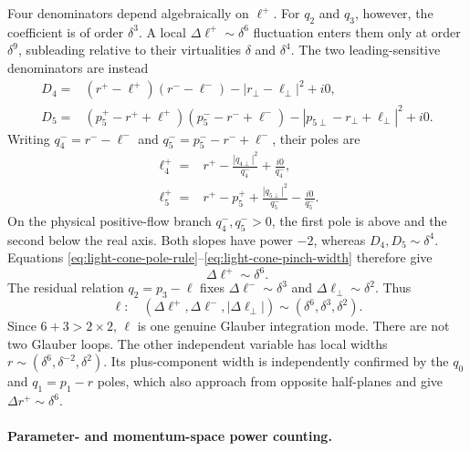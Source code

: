 \documentclass[a4paper,11pt]{article}
\begin{document}
Four denominators depend algebraically on \(\ell^+\).  For \(q_2\) and
\(q_3\), however, the coefficient is of order \(\delta^3\).  A local
\(\Delta\ell^+\sim\delta^6\) fluctuation enters them only at order
\(\delta^9\), subleading relative to their virtualities \(\delta\) and
\(\delta^4\).  The two leading-sensitive denominators are instead
\begin{align}
 D_4={}&(r^+-\ell^+)(r^--\ell^-)
       -|r_\perp-\ell_\perp|^2+i0,
 \label{eq:five-mrk-D4}\\
 D_5={}&(p_5^+-r^++\ell^+)(p_5^--r^-+\ell^-)
       -|p_{5\perp}-r_\perp+\ell_\perp|^2+i0.
 \label{eq:five-mrk-D5}
\end{align}
Writing \(q_4^-=r^--\ell^-\) and
\(q_5^-=p_5^--r^-+\ell^-\), their poles are
\begin{align}
 \ell_4^+={}&r^+-\frac{|q_{4\perp}|^2}{q_4^-}
              +\frac{i0}{q_4^-},
 \label{eq:five-mrk-pole4}\\
 \ell_5^+={}&r^+-p_5^++\frac{|q_{5\perp}|^2}{q_5^-}
              -\frac{i0}{q_5^-}.
 \label{eq:five-mrk-pole5}
\end{align}
On the physical positive-flow branch \(q_4^-,q_5^->0\), the first pole is
above and the second below the real axis.  Both slopes have power \(-2\),
whereas \(D_4,D_5\sim\delta^4\).  Equations
\eqref{eq:light-cone-pole-rule}--\eqref{eq:light-cone-pinch-width} therefore
give
\begin{equation}
 \Delta\ell^+\sim\delta^6.
 \label{eq:five-mrk-ellplus-width}
\end{equation}
The residual relation \(q_2=p_3-\ell\) fixes
\(\Delta\ell^-\sim\delta^3\) and
\(\Delta\ell_\perp\sim\delta^2\).  Thus
\begin{equation}
 \ell:\quad (\Delta\ell^+,\Delta\ell^-,
                   |\Delta\ell_\perp|)
       \sim(\delta^6,\delta^3,\delta^2).
 \label{eq:five-mrk-glauber-widths}
\end{equation}
Since \(6+3>2\times2\), \(\ell\) is one genuine Glauber integration mode.
There are not two Glauber loops.  The other independent variable has local
widths \(r\sim(\delta^6,\delta^{-2},\delta^2)\).  Its plus-component width
is independently confirmed by the \(q_0\) and \(q_1=p_1-r\) poles, which
also approach from opposite half-planes and give
\(\Delta r^+\sim\delta^6\).

\paragraph{Parameter- and momentum-space power counting.}
\end{document}
